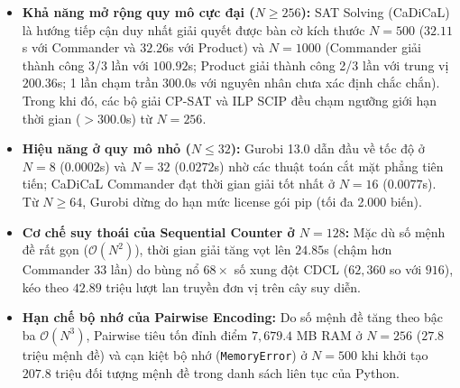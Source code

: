\documentclass[11pt,a4paper]{article}
\begin{document}
\begin{tcolorbox}[
    colback=boxbg, colframe=boxborder, arc=2mm, boxrule=0.85pt,
    left=12pt, right=12pt, top=8pt, bottom=8pt,
    title=\textbf{\color{primaryblue}Tóm tắt các Phát hiện Thực nghiệm Cốt lõi (Key Experimental Takeaways)},
    coltitle=primaryblue
]
\begin{itemize}[leftmargin=1.5em, itemsep=0.25em, topsep=0.2em]
    \item \textbf{Khả năng mở rộng quy mô cực đại ($N \ge 256$):} SAT Solving (CaDiCaL) là hướng tiếp cận duy nhất giải quyết được bàn cờ kích thước $N=500$ ($32.11$s với Commander và $32.26$s với Product) và $N=1000$ (Commander giải thành công 3/3 lần với $100.92$s; Product giải thành công 2/3 lần với trung vị $200.36$s; 1 lần chạm trần 300.0s với nguyên nhân chưa xác định chắc chắn). Trong khi đó, các bộ giải CP-SAT và ILP SCIP đều chạm ngưỡng giới hạn thời gian ($>300.0$s) từ $N=256$.
    \item \textbf{Hiệu năng ở quy mô nhỏ ($N \le 32$):} Gurobi 13.0 dẫn đầu về tốc độ ở $N=8$ ($0.0002$s) và $N=32$ ($0.0272$s) nhờ các thuật toán cắt mặt phẳng tiên tiến; CaDiCaL Commander đạt thời gian giải tốt nhất ở $N=16$ ($0.0077$s). Từ $N \ge 64$, Gurobi dừng do hạn mức license gói pip (tối đa 2.000 biến).
    \item \textbf{Cơ chế suy thoái của Sequential Counter ở $N=128$:} Mặc dù số mệnh đề rất gọn ($\mathcal{O}(N^2)$), thời gian giải tăng vọt lên $24.85$s (chậm hơn Commander 33 lần) do bùng nổ $68\times$ số xung đột CDCL ($62{,}360$ so với $916$), kéo theo $42.89$ triệu lượt lan truyền đơn vị trên cây suy diễn.
    \item \textbf{Hạn chế bộ nhớ của Pairwise Encoding:} Do số mệnh đề tăng theo bậc ba $\mathcal{O}(N^3)$, Pairwise tiêu tốn đỉnh điểm $7{,}679.4$ MB RAM ở $N=256$ ($27.8$ triệu mệnh đề) và cạn kiệt bộ nhớ (\texttt{MemoryError}) ở $N=500$ khi khởi tạo $207.8$ triệu đối tượng mệnh đề trong danh sách liên tục của Python.
\end{itemize}
\end{tcolorbox}
\end{document}
